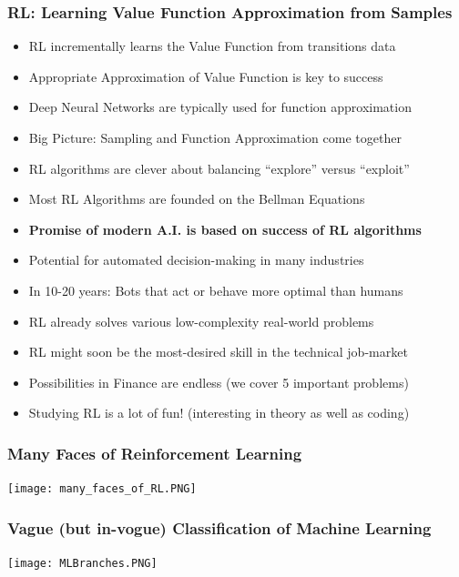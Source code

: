 \documentclass[handout]{beamer}
\begin{document}
\begin{frame}
\frametitle{RL: Learning Value Function Approximation from Samples}
\pause
\begin{itemize}[<+->]
\item RL incrementally learns the Value Function from transitions data
\item Appropriate Approximation of Value Function is key to success
\item Deep Neural Networks are typically used for function approximation
\item Big Picture: Sampling and Function Approximation come together
\item RL algorithms are clever about balancing  ``explore'' versus ``exploit''
\item Most RL Algorithms are founded on the Bellman Equations
\item {\bf Promise of modern A.I. is based on success of RL algorithms}
\item Potential for automated decision-making in many industries
\item In 10-20 years: Bots that act or behave more optimal than humans
\item RL already solves various low-complexity real-world problems
\item RL might soon be the most-desired skill in the technical job-market
\item Possibilities in Finance are endless (we cover 5 important problems)
\item Studying RL is a lot of fun! (interesting in theory as well as coding)
\end{itemize}
\end{frame}

\begin{frame}
\frametitle{Many Faces of Reinforcement Learning}
\texttt{[image: many\_faces\_of\_RL.PNG]}
\end{frame}

\begin{frame}
\frametitle{Vague (but in-vogue) Classification of Machine Learning}
\texttt{[image: MLBranches.PNG]}
\end{frame}
\end{document}
